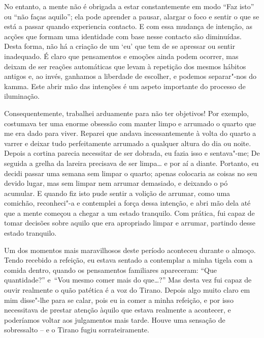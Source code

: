 No entanto, a mente não é obrigada a estar constantemente em modo “Faz
isto” ou “não faças aquilo”; ela pode aprender a pausar, alargar o foco
e sentir o que se está a passar quando experiencia contacto. E com essa
mudança de intenção, as acções que formam uma identidade com base nesse
contacto são diminuídas. Desta forma, não há a criação de um `eu' que
tem de se apressar ou sentir inadequado. É claro que pensamentos e
emoções ainda podem ocorrer, mas deixam de ser reações automáticas que
levam à repetição dos mesmos hábitos antigos e, ao invés, ganhamos a
liberdade de escolher, e podemos separar"-nos do kamma. Este abrir mão
das intenções é um aspeto importante do processo de iluminação.

\sectionBreak

Consequentemente, trabalhei arduamente para não ter objetivos! Por
exemplo, costumava ter uma enorme obsessão com manter limpo e arrumado o
quarto que me era dado para viver. Reparei que andava incessantemente à
volta do quarto a varrer e deixar tudo perfeitamente arrumado a qualquer
altura do dia ou noite. Depois a cortina parecia necessitar de ser
dobrada, eu fazia isso e sentava"-me; De seguida a grelha da lareira
precisava de ser limpa\ldots{} e por aí a diante. Portanto, eu decidi passar
uma semana sem limpar o quarto; apenas colocaria as coisas no seu devido
lugar, mas sem limpar nem arrumar demasiado, e deixando o pó acumular. E
quando fiz isto pude sentir a volição de arrumar, como uma comichão,
reconheci"-a e contemplei a força dessa intenção, e abri mão dela até que
a mente começou a chegar a um estado tranquilo. Com prática, fui capaz
de tomar decisões sobre aquilo que era apropriado limpar e arrumar,
partindo desse estado tranquilo.

\enlargethispage*{\baselineskip}

Um dos momentos mais maravilhosos deste período aconteceu durante o
almoço. Tendo recebido a refeição, eu estava sentado a contemplar a
minha tigela com a comida dentro, quando os pensamentos familiares
apareceram: “Que quantidade?” e~“Vou mesmo comer mais do que\ldots{}?” Mas
desta vez fui capaz de ouvir realmente o quão patética é a voz do
Tirano. Depois algo muito claro em mim disse"-lhe para se calar, pois eu
ia comer a minha refeição, e por isso necessitava de prestar atenção
àquilo que estava realmente a acontecer, e poderíamos voltar aos
julgamentos mais tarde. Houve uma sensação de sobressalto -- e o Tirano
fugiu sorrateiramente.

\enlargethispage*{\baselineskip}

